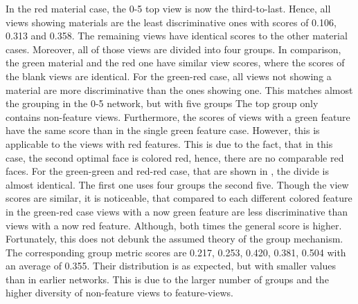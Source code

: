 In the red material case, the 0-5 top view is now the third-to-last.
Hence, all views showing materials are the least discriminative ones with scores of 0.106, 0.313 and 0.358.
The remaining views have identical scores to the other material cases.
Moreover, all of those views are divided into four groups.
In comparison, the green material and the red one have similar view scores, where the scores of the blank views are identical.
For the green-red case, all views not showing a material are more discriminative than the ones showing one.
This matches almost the grouping in the 0-5 network, but with five groups
The top group only contains non-feature views.
Furthermore, the scores of views with a green feature have the same score than in the single green feature case.
However, this is applicable to the views with red features.
This is due to the fact, that in this case, the second optimal face is colored red, hence, there are no comparable red faces.
For the green-green and red-red case, that are shown in , the divide is almost identical.
The first one uses four groups the second five.
Though the view scores are similar, it is noticeable, that compared to each different colored feature in the green-red case views with a now green feature are less discriminative than views with a now red feature.
Although, both times the general score is higher.
Fortunately, this does not debunk the assumed theory of the group mechanism.
The corresponding group metric scores are 0.217, 0.253, 0.420, 0.381, 0.504 with an average of 0.355.
Their distribution is as expected, but with smaller values than in earlier networks.
This is due to the larger number of groups and the higher diversity of non-feature views to feature-views.

